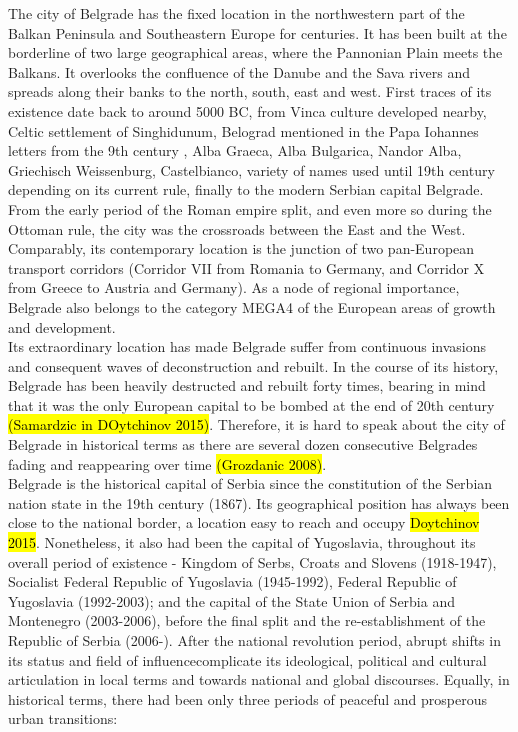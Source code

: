 \documentclass[11pt]{report}
\begin{document}
The city of Belgrade has the fixed location in the northwestern part of the Balkan Peninsula and Southeastern Europe for centuries. It  has  been  built  at  the borderline of two large geographical areas, where the Pannonian Plain meets the Balkans. It overlooks the confluence of the Danube and the Sava rivers and spreads along their banks to the north, south, east and west. First traces of its existence date back to around 5000 BC, from Vinca culture developed nearby, Celtic settlement of Singhidunum, Belograd mentioned in the Papa Iohannes letters from the 9th century , Alba  Graeca,  Alba  Bulgarica,  Nandor  Alba,  Griechisch Weissenburg, Castelbianco, variety of names used until 19th century depending on its current rule, finally to the modern Serbian capital Belgrade. From the early period of the Roman empire split, and even more so during the Ottoman rule, the city was the crossroads between the East and the West. Comparably, its contemporary location is the junction of two pan-European transport corridors (Corridor VII from Romania to Germany, and Corridor X from Greece to Austria and Germany). As a node of regional importance, Belgrade also belongs to the category MEGA4 of the European areas of growth and development.
\\
Its extraordinary location has made Belgrade suffer from continuous invasions and consequent waves of deconstruction and rebuilt. In the course of its history, Belgrade has been heavily destructed and rebuilt forty times, bearing in mind that it was the only European capital to be bombed at the end of 20th century \hl{(Samardzic in DOytchinov 2015)}. Therefore, it is hard to speak about the city of Belgrade in historical terms as there are several  dozen  consecutive  Belgrades fading and reappearing over time \hl{(Grozdanic 2008)}.
\\
Belgrade is the historical capital of Serbia since the constitution of the Serbian nation state in the 19th century (1867). Its geographical position has always been close to the national border, a location easy to reach and occupy \hl{Doytchinov 2015}.
Nonetheless, it also had been the capital of Yugoslavia, throughout its overall period of existence - Kingdom of Serbs, Croats and Slovens (1918-1947), Socialist Federal Republic of Yugoslavia (1945-1992), Federal Republic of Yugoslavia (1992-2003); and the capital of the State Union of Serbia and Montenegro (2003-2006), before the final split and the re-establishment of the Republic of Serbia (2006-). After the national revolution period, abrupt shifts in its status and field of influence\footnotemark complicate its ideological, political and cultural articulation in local terms and towards national and global discourses. Equally, in historical terms, there had been only three periods of peaceful and prosperous urban transitions:
\end{document}

